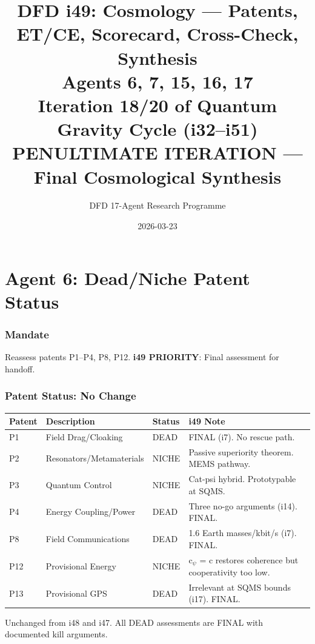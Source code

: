 \documentclass[11pt,a4paper]{article}
\title{DFD i49: Cosmology --- Patents, ET/CE, Scorecard, Cross-Check, Synthesis\\[6pt]
\large Agents 6, 7, 15, 16, 17\\[6pt]
\normalsize Iteration 18/20 of Quantum Gravity Cycle (i32--i51)\\[6pt]
\textbf{PENULTIMATE ITERATION --- Final Cosmological Synthesis}}
\author{DFD 17-Agent Research Programme}
\date{2026-03-23}
\begin{document}
\maketitle
\tableofcontents
\newpage

\part{Agent 6: Dead/Niche Patent Status}
\label{part:agent6}

\section{Mandate}

Reassess patents P1--P4, P8, P12. \textbf{i49 PRIORITY}: Final assessment for handoff.

\section{Patent Status: No Change}

\begin{center}
\begin{tabular}{llll}
\toprule
\textbf{Patent} & \textbf{Description} & \textbf{Status} & \textbf{i49 Note} \\
\midrule
P1 & Field Drag/Cloaking & DEAD & FINAL (i7). No rescue path. \\
P2 & Resonators/Metamaterials & NICHE & Passive superiority theorem. MEMS pathway. \\
P3 & Quantum Control & NICHE & Cat-psi hybrid. Prototypable at SQMS. \\
P4 & Energy Coupling/Power & DEAD & Three no-go arguments (i14). FINAL. \\
P8 & Field Communications & DEAD & 1.6 Earth masses/kbit/s (i7). FINAL. \\
P12 & Provisional Energy & NICHE & c$_\psi$ = c restores coherence but cooperativity too low. \\
P13 & Provisional GPS & DEAD & Irrelevant at SQMS bounds (i17). FINAL. \\
\bottomrule
\end{tabular}
\end{center}

Unchanged from i48 and i47. All DEAD assessments are FINAL with documented kill arguments.
\end{document}
